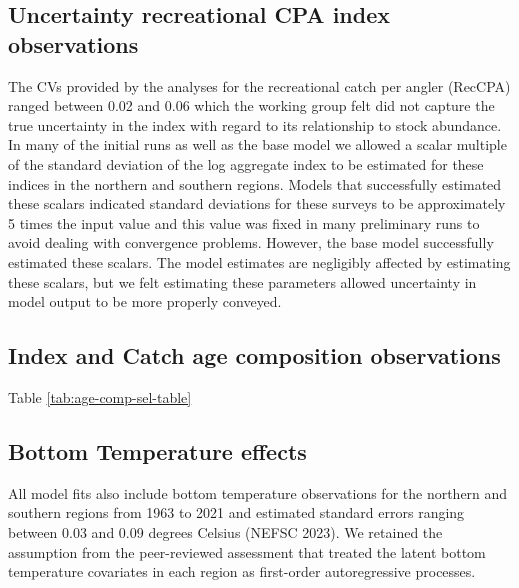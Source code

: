 \documentclass[
]{article}
\begin{document}
\hypertarget{uncertainty-recreational-cpa-index-observations}{%
\subsection*{Uncertainty recreational CPA index
observations}\label{uncertainty-recreational-cpa-index-observations}}

The CVs provided by the analyses for the recreational catch per angler
(RecCPA) ranged between 0.02 and 0.06 which the working group felt did
not capture the true uncertainty in the index with regard to its
relationship to stock abundance. In many of the initial runs as well as
the base model we allowed a scalar multiple of the standard deviation of
the log aggregate index to be estimated for these indices in the
northern and southern regions. Models that successfully estimated these
scalars indicated standard deviations for these surveys to be
approximately 5 times the input value and this value was fixed in many
preliminary runs to avoid dealing with convergence problems. However,
the base model successfully estimated these scalars. The model estimates
are negligibly affected by estimating these scalars, but we felt
estimating these parameters allowed uncertainty in model output to be
more properly conveyed.

\hypertarget{index-and-catch-age-composition-observations}{%
\subsection*{Index and Catch age composition
observations}\label{index-and-catch-age-composition-observations}}

Table \ref{tab:age-comp-sel-table}

\hypertarget{bottom-temperature-effects}{%
\subsection*{Bottom Temperature
effects}\label{bottom-temperature-effects}}

All model fits also include bottom temperature observations for the
northern and southern regions from 1963 to 2021 and estimated standard
errors ranging between 0.03 and 0.09 degrees Celsius (NEFSC 2023). We
retained the assumption from the peer-reviewed assessment that treated
the latent bottom temperature covariates in each region as first-order
autoregressive processes.
\end{document}
